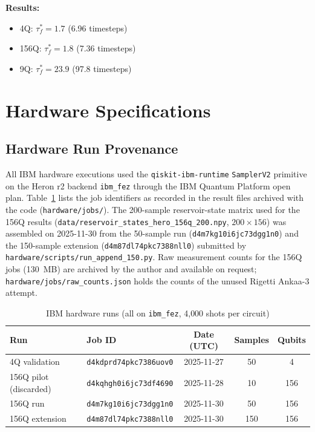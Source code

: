 \documentclass[conference]{IEEEtran}
\begin{document}
\textbf{Results:}
\begin{itemize}
    \item 4Q: $\tau_f^* = 1.7$ (6.96 timesteps)
    \item 156Q: $\tau_f^* = 1.8$ (7.36 timesteps)
    \item 9Q: $\tau_f^* = 23.9$ (97.8 timesteps)
\end{itemize}

\section{Hardware Specifications}
\label{app:hardware_specs}

\subsection{Hardware Run Provenance}
\label{app:provenance}

All IBM hardware executions used the \texttt{qiskit-ibm-runtime} \texttt{SamplerV2} primitive on the Heron r2 backend \texttt{ibm\_fez} through the IBM Quantum Platform open plan. Table~\ref{tab:provenance} lists the job identifiers as recorded in the result files archived with the code (\texttt{hardware/jobs/}). The 200-sample reservoir-state matrix used for the 156Q results (\texttt{data/reservoir\_states\_hero\_156q\_200.npy}, $200 \times 156$) was assembled on 2025-11-30 from the 50-sample run (\texttt{d4m7kg10i6jc73dgg1n0}) and the 150-sample extension (\texttt{d4m87dl74pkc7388nll0}) submitted by \texttt{hardware/scripts/run\_append\_150.py}. Raw measurement counts for the 156Q jobs (130~MB) are archived by the author and available on request; \texttt{hardware/jobs/raw\_counts.json} holds the counts of the unused Rigetti Ankaa-3 attempt.

\begin{table}[!htbp]
\centering
\caption{IBM hardware runs (all on \texttt{ibm\_fez}, 4{,}000 shots per circuit)}
\label{tab:provenance}
\begin{tabular}{@{}llccc@{}}
\toprule
\textbf{Run} & \textbf{Job ID} & \textbf{Date (UTC)} & \textbf{Samples} & \textbf{Qubits} \\
\midrule
4Q validation & \texttt{d4kdprd74pkc7386uov0} & 2025-11-27 & 50 & 4 \\
156Q pilot (discarded) & \texttt{d4kqhgh0i6jc73df4690} & 2025-11-28 & 10 & 156 \\
156Q run & \texttt{d4m7kg10i6jc73dgg1n0} & 2025-11-30 & 50 & 156 \\
156Q extension & \texttt{d4m87dl74pkc7388nll0} & 2025-11-30 & 150 & 156 \\
\bottomrule
\end{tabular}
\end{table}
\end{document}
